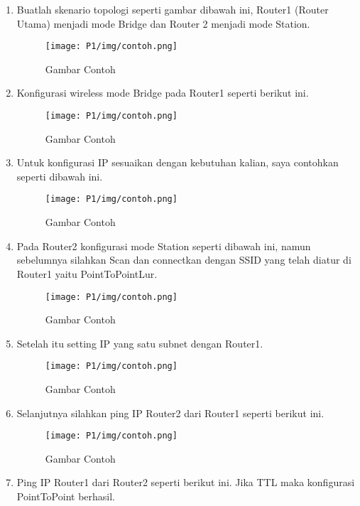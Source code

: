\begin{center}
	\begin{enumerate}
		\item Buatlah skenario topologi seperti gambar dibawah ini, Router1 (Router Utama) menjadi mode Bridge dan Router 2 menjadi mode Station.
		\begin{figure}[H]
			\centering
			\texttt{[image: P1/img/contoh.png]}
			\caption{Gambar Contoh}
			\label{fig:gambarcontoh}
		\end{figure}
		\item Konfigurasi wireless mode Bridge pada Router1 seperti berikut ini.
		\begin{figure}[H]
			\centering
			\texttt{[image: P1/img/contoh.png]}
			\caption{Gambar Contoh}
			\label{fig:gambarcontoh}
		\end{figure}
		\item Untuk konfigurasi IP sesuaikan dengan kebutuhan kalian, saya contohkan seperti dibawah ini.
		\begin{figure}[H]
			\centering
			\texttt{[image: P1/img/contoh.png]}
			\caption{Gambar Contoh}
			\label{fig:gambarcontoh}
		\end{figure}
		\item Pada Router2 konfigurasi mode Station seperti dibawah ini, namun sebelumnya silahkan Scan dan connectkan dengan SSID yang telah diatur di Router1 yaitu PointToPointLur.
		\begin{figure}[H]
			\centering
			\texttt{[image: P1/img/contoh.png]}
			\caption{Gambar Contoh}
			\label{fig:gambarcontoh}
		\end{figure}
		\item Setelah itu setting IP yang satu subnet dengan Router1.
		\begin{figure}[H]
			\centering
			\texttt{[image: P1/img/contoh.png]}
			\caption{Gambar Contoh}
			\label{fig:gambarcontoh}
		\end{figure}
		\item Selanjutnya silahkan ping IP Router2 dari Router1 seperti berikut ini.
		\begin{figure}[H]
			\centering
			\texttt{[image: P1/img/contoh.png]}
			\caption{Gambar Contoh}
			\label{fig:gambarcontoh}
		\end{figure}
		\item Ping IP Router1 dari Router2 seperti berikut ini. Jika TTL maka konfigurasi PointToPoint berhasil.

\end{enumerate}
\end{center}
